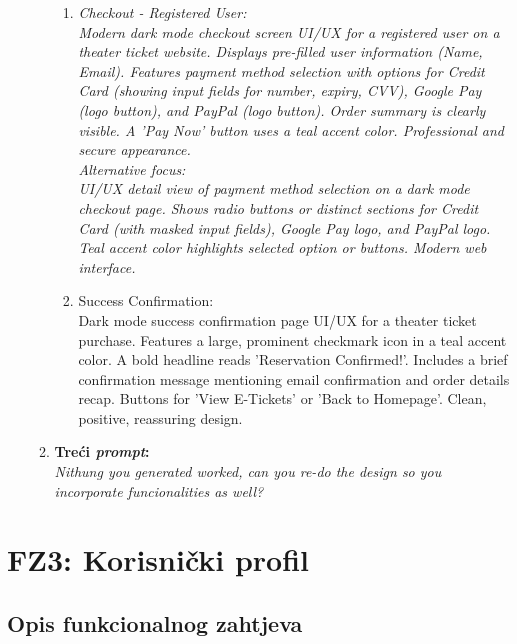 \begin{itemize}
\begin{enumerate}[itemsep=1ex]
\begin{enumerate}[itemsep=0.5ex]
        \item \textit{Checkout - Registered User:\\ Modern dark mode checkout screen UI/UX for a registered user on a theater ticket website. Displays pre-filled user information (Name, Email). Features payment method selection with options for Credit Card (showing input fields for number, expiry, CVV), Google Pay (logo button), and PayPal (logo button). Order summary is clearly visible. A 'Pay Now' button uses a teal accent color. Professional and secure appearance.} \\
                   \textit{ Alternative focus: \\UI/UX detail view of payment method selection on a dark mode checkout page. Shows radio buttons or distinct sections for Credit Card (with masked input fields), Google Pay logo, and PayPal logo. Teal accent color highlights selected option or buttons. Modern web interface.} \\

          \item Success Confirmation: \\Dark mode success confirmation page UI/UX for a theater ticket purchase. Features a large, prominent checkmark icon in a teal accent color. A bold headline reads 'Reservation Confirmed!'. Includes a brief confirmation message mentioning email confirmation and order details recap. Buttons for 'View E-Tickets' or 'Back to Homepage'. Clean, positive, reassuring design. \\
          \end{enumerate}

    \item \textbf{Treći \textit{prompt}:}\\

          \textit{Nithung you generated worked, can you re-do the design so you incorporate funcionalities as well?} %
\end{enumerate}

\end{itemize}  

\sloppy  
\newpage
\section{FZ3: Korisnički profil}

\sloppy

\subsection{Opis funkcionalnog zahtjeva}

